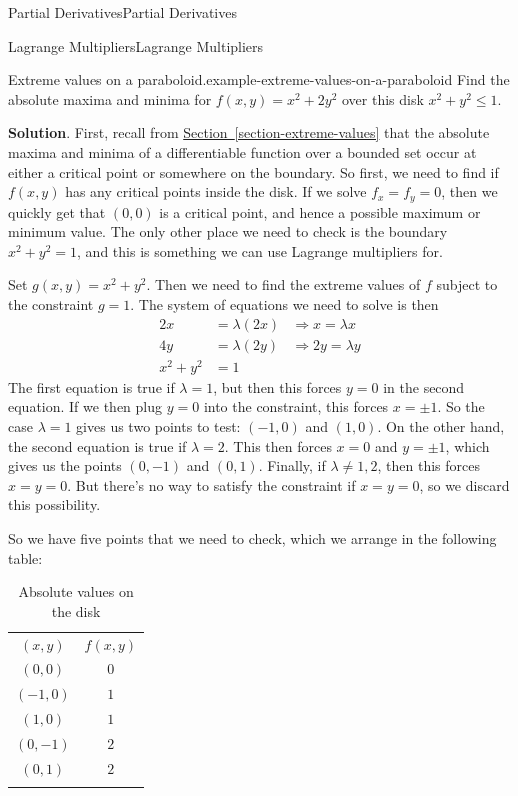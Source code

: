 \documentclass[10pt,]{book}
\numberwithin{equation}{section}
\newcommand{\hrulethin}  {\noalign{\hrule height 0.04em}}
\newcommand{\hrulethick} {\noalign{\hrule height 0.11em}}
\begin{document}
\begin{chapterptx}{Partial Derivatives}{}{Partial Derivatives}{}{}
\begin{sectionptx}{Lagrange Multipliers}{}{Lagrange Multipliers}{}{}
\begin{example}{Extreme values on a paraboloid.}{example-extreme-values-on-a-paraboloid}
\hypertarget{p-1231}{}%
Find the absolute maxima and minima for \(f(x,y) = x^{2} + 2y^{2}\) over this disk \(x^{2} + y^{2} \leq 1\).%
\par\smallskip%
\noindent\textbf{Solution}.\hypertarget{solution-194}{}\quad%
\hypertarget{p-1232}{}%
First, recall from \hyperref[section-extreme-values]{Section~\ref{section-extreme-values}} that the absolute maxima and minima of a differentiable function over a bounded set occur at either a critical point or somewhere on the boundary. So first, we need to find if \(f(x,y)\) has any critical points inside the disk. If we solve \(f_{x} = f_{y} = 0\), then we quickly get that \((0,0)\) is a critical point, and hence a possible maximum or minimum value. The only other place we need to check is the boundary \(x^{2} + y^{2} = 1\), and this is something we can use Lagrange multipliers for.%
\par
\hypertarget{p-1233}{}%
Set \(g(x,y) = x^{2} + y^{2}\). Then we need to find the extreme values of \(f\) subject to the constraint \(g = 1\). The system of equations we need to solve is then%
\begin{align*}
2x & = \lambda(2x) & \Rightarrow x = \lambda x \\
4y & = \lambda(2y) & \Rightarrow 2y = \lambda y\\
x^{2} + y^{2} & = 1 
\end{align*}
The first equation is true if \(\lambda = 1\), but then this forces \(y = 0\) in the second equation. If we then plug \(y = 0\) into the constraint, this forces \(x = \pm1\). So the case \(\lambda=1\) gives us two points to test: \((-1,0)\) and \((1,0)\). On the other hand, the second equation is true if \(\lambda = 2\). This then forces \(x = 0\) and \(y = \pm 1\), which gives us the points \((0,-1)\) and \((0,1)\). Finally, if \(\lambda\neq1,2\), then this forces \(x = y = 0\). But there's no way to satisfy the constraint if \(x = y = 0\), so we discard this possibility.%
\par
\hypertarget{p-1234}{}%
So we have five points that we need to check, which we arrange in the following table: \leavevmode%
\begin{table}
\centering
\begin{tabular}{cc}\hrulethick
\((x,y)\)&\(f(x,y)\)\tabularnewline\hrulethin
\((0,0)\)&\(0\)\tabularnewline[0pt]
\((-1,0)\)&\(1\)\tabularnewline[0pt]
\((1,0)\)&\(1\)\tabularnewline[0pt]
\((0,-1)\)&\(2\)\tabularnewline[0pt]
\((0,1)\)&\(2\)\tabularnewline\hrulethick
\end{tabular}
\caption{Absolute values on the disk\label{table-lagrange-example-2}}

\end{table}
\end{example}
\end{sectionptx}
\end{chapterptx}
\end{document}

